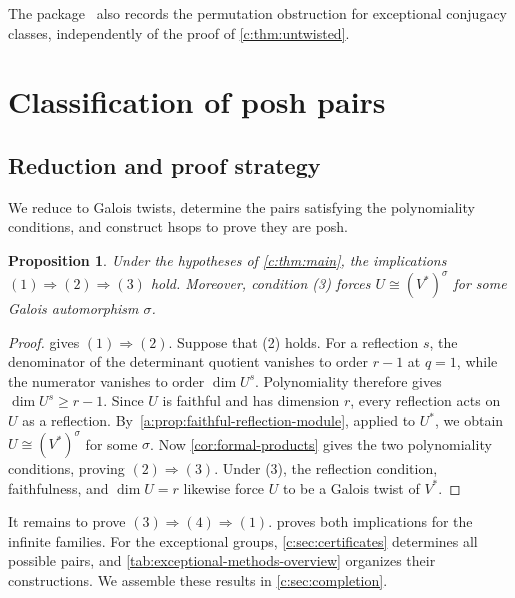 \documentclass[11pt]{amsart}
\newtheorem{proposition}[theorem]{Proposition}
\theoremstyle{definition}
\begin{document}
The package~\cite{Computations} also records the permutation obstruction
for exceptional conjugacy classes, independently of the proof of
\cref{c:thm:untwisted}.

\section{Classification of posh pairs}\label{sec:proof-algebraic}\label{sec:computations}

\subsection{Reduction and proof strategy}\label{c:sec:reduction}

We reduce to Galois twists, determine the pairs satisfying the
polynomiality conditions, and construct hsops to prove they are posh.

\classificationtheorem*

\begin{proposition}\label{c:prop:reduction}
Under the hypotheses of \cref{c:thm:main}, the implications
$(1)\Rightarrow(2)\Rightarrow(3)$ hold. Moreover, condition (3) forces
$U\cong(V^*)^\sigma$ for some Galois automorphism $\sigma$.
\end{proposition}

\begin{proof}
 gives $(1)\Rightarrow(2)$.
Suppose that (2) holds. For a reflection $s$, the denominator of the
determinant quotient vanishes to order $r-1$ at $q=1$, while the
numerator vanishes to order $\dim U^s$. Polynomiality therefore gives
$\dim U^s\geq r-1$. Since $U$ is faithful and has dimension $r$,
every reflection acts on $U$ as a reflection.
By~\cref{a:prop:faithful-reflection-module}, applied to $U^*$,
we obtain $U\cong(V^*)^\sigma$ for some $\sigma$.
Now \cref{cor:formal-products} gives the two polynomiality conditions,
proving $(2)\Rightarrow(3)$.
Under (3), the reflection condition, faithfulness, and
$\dim U=r$ likewise force $U$ to be a Galois twist of $V^*$.
\end{proof}

It remains to prove $(3)\Rightarrow(4)\Rightarrow(1)$.
 proves both implications for the infinite
families. For the exceptional groups,
\cref{c:sec:certificates} determines all possible pairs, and
\cref{tab:exceptional-methods-overview} organizes their constructions.
We assemble these results in \cref{c:sec:completion}.
\end{document}
